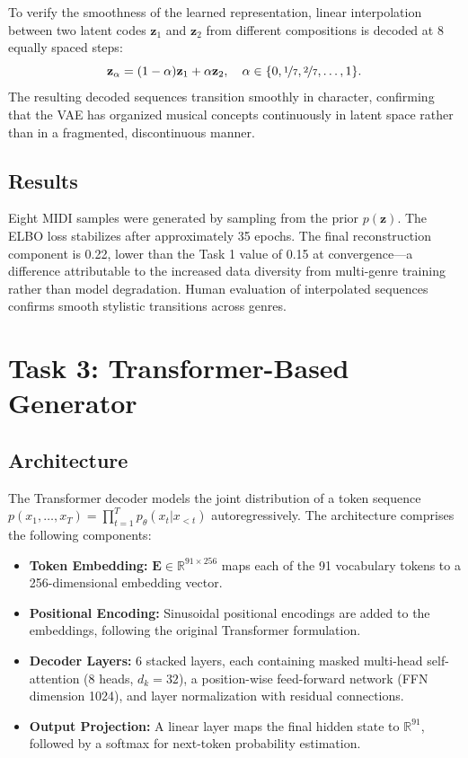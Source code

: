\documentclass{article}
\begin{document}
To verify the smoothness of the learned representation, linear interpolation between two latent codes $\mathbf{z}_1$ and $\mathbf{z}_2$ from different compositions is decoded at 8 equally spaced steps:
\begin{equation}
  \mathbf{z}_\alpha = (1-\alpha)\mathbf{z}_1 + \alpha\mathbf{z}_2, \quad \alpha \in \{0, \nicefrac{1}{7}, \nicefrac{2}{7}, \ldots, 1\}.
\end{equation}
The resulting decoded sequences transition smoothly in character, confirming that the VAE has organized musical concepts continuously in latent space rather than in a fragmented, discontinuous manner.

\subsection{Results}

Eight MIDI samples were generated by sampling from the prior $p(\mathbf{z})$. The ELBO loss stabilizes after approximately 35 epochs. The final reconstruction component is 0.22, lower than the Task 1 value of 0.15 at convergence—a difference attributable to the increased data diversity from multi-genre training rather than model degradation. Human evaluation of interpolated sequences confirms smooth stylistic transitions across genres.

\section{Task 3: Transformer-Based Generator}
\label{sec:task3}

\subsection{Architecture}

The Transformer decoder \cite{vaswani2017attention} models the joint distribution of a token sequence $p(x_1, \ldots, x_T) = \prod_{t=1}^{T} p_\theta(x_t | x_{<t})$ autoregressively. The architecture comprises the following components:

\begin{itemize}
  \item \textbf{Token Embedding:} $\mathbf{E} \in \mathbb{R}^{91 \times 256}$ maps each of the 91 vocabulary tokens to a 256-dimensional embedding vector.
  \item \textbf{Positional Encoding:} Sinusoidal positional encodings are added to the embeddings, following the original Transformer formulation.
  \item \textbf{Decoder Layers:} 6 stacked layers, each containing masked multi-head self-attention (8 heads, $d_k = 32$), a position-wise feed-forward network (FFN dimension 1024), and layer normalization with residual connections.
  \item \textbf{Output Projection:} A linear layer maps the final hidden state to $\mathbb{R}^{91}$, followed by a softmax for next-token probability estimation.
\end{itemize}
\end{document}
